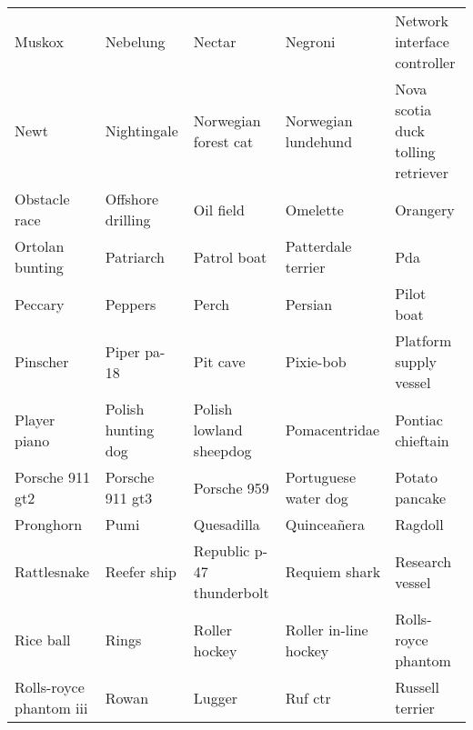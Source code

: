 \documentclass[10pt,journal,compsoc]{IEEEtran}
\begin{document}
\begin{table*}[!h]
\begin{tabular}{lllll}
Muskox                    & Nebelung                        & Nectar                            & Negroni                                    & Network interface controller       \\
Newt                      & Nightingale                     & Norwegian forest cat              & Norwegian lundehund                        & Nova scotia duck tolling retriever \\
Obstacle race             & Offshore drilling               & Oil field                         & Omelette                                   & Orangery                           \\
Ortolan bunting           & Patriarch                       & Patrol boat                       & Patterdale terrier                         & Pda                                \\
Peccary                   & Peppers                         & Perch                             & Persian                                    & Pilot boat                         \\
Pinscher                  & Piper pa-18                     & Pit cave                          & Pixie-bob                                  & Platform supply vessel             \\
Player piano              & Polish hunting dog              & Polish lowland sheepdog           & Pomacentridae                              & Pontiac chieftain                  \\
Porsche 911 gt2           & Porsche 911 gt3                 & Porsche 959                       & Portuguese water dog                       & Potato pancake                     \\
Pronghorn                 & Pumi                            & Quesadilla                        & Quinceañera                                & Ragdoll                            \\
Rattlesnake               & Reefer ship                     & Republic p-47 thunderbolt         & Requiem shark                              & Research vessel                    \\
Rice ball                 & Rings                           & Roller hockey                     & Roller in-line hockey                      & Rolls-royce phantom                \\
Rolls-royce phantom iii   & Rowan                           & Lugger                            & Ruf ctr                                    & Russell terrier                    \\

\end{tabular}
\end{table*}
\end{document}
